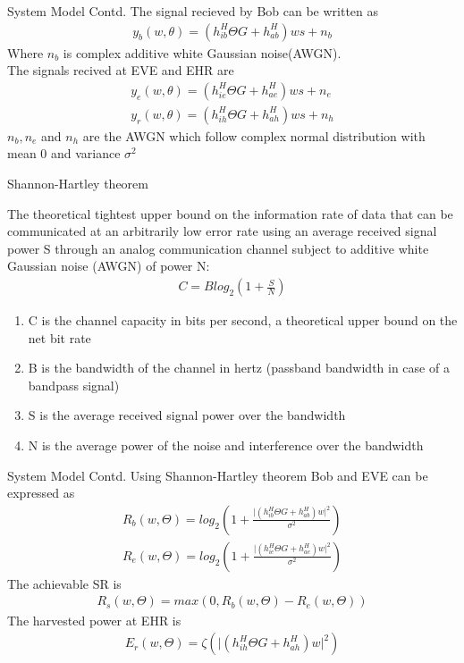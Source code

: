 \documentclass{beamer}
\providecommand{\brak}[1]{\ensuremath{\left(#1\right)}}
\providecommand{\abs}[1]{\vert#1\vert}
\begin{document}
\begin{frame}{System Model Contd.}
The signal recieved by Bob can be written as        
\begin{align}
    y_{b}(w, \theta)=\brak{h^{H}_{ib}\Theta G + h^{H}
_{ab}}ws + n_{b}
\end{align}
Where $n_{b}$ is complex additive white Gaussian noise(AWGN).\\
The signals recived at EVE and EHR are
\begin{align}
    y_{e}(w, \theta)=\brak{h^{H}_{ie}\Theta G + h^{H}
_{ae}}ws + n_{e}\\
 y_{r}(w, \theta)=\brak{h^{H}_{ih}\Theta G + h^{H}
_{ah}}ws + n_{h}
\end{align}
$n_{b},n_{e}$ and  $n_{h}$ are the AWGN which follow complex normal distribution with mean 0 and variance $\sigma^{2}$
\end{frame}
\begin{frame}{Shannon-Hartley theorem} \label{shannon}
    \begin{theorem} The theoretical tightest upper bound on the information rate of data that can be communicated at an arbitrarily low error rate using an average received signal power S through an analog communication channel subject to additive white Gaussian noise (AWGN) of power N:
     \begin{align}
         C=Blog_{2}\brak{1+\frac{S}{N}}
     \end{align}
     \begin{enumerate}
         \item C is the channel capacity in bits per second, a theoretical upper bound on the net bit rate 
         \item B is the bandwidth of the channel in hertz (passband bandwidth in case of a bandpass signal)
         \item S is the average received signal power over the bandwidth
         \item N is the average power of the noise and interference over the bandwidth
     \end{enumerate}
     \end{theorem}
\end{frame}
 \begin{frame}{System Model Contd.} 
Using Shannon-Hartley theorem 
Bob and EVE can be expressed as
\begin{align}
    R_{b}\brak{w,\Theta}=log_{2}\brak{1+\frac{\abs{\brak{h_{ib}^{H}\Theta G + h_{ab}^{H}}w}^{2}}{\sigma^{2}}}\\
    R_{e}\brak{w,\Theta}=log_{2}\brak{1+\frac{\abs{\brak{h_{ie}^{H}\Theta G + h_{ae}^{H}}w}^{2}}{\sigma^{2}}}
\end{align}
The achievable SR is 
\begin{align}
    R_{s}\brak{w,\Theta}=max\brak{0,R_{b}\brak{w,\Theta}-R_{e}\brak{w,\Theta}}
\end{align}
The harvested power at EHR is 
\begin{align}
    E_{r}\brak{w,\Theta}=\zeta\brak{\abs{\brak{h_{ih}^{H}\Theta G + h_{ah}^{H}}w}^{2}}
\end{align}
\end{frame}
\end{document}
